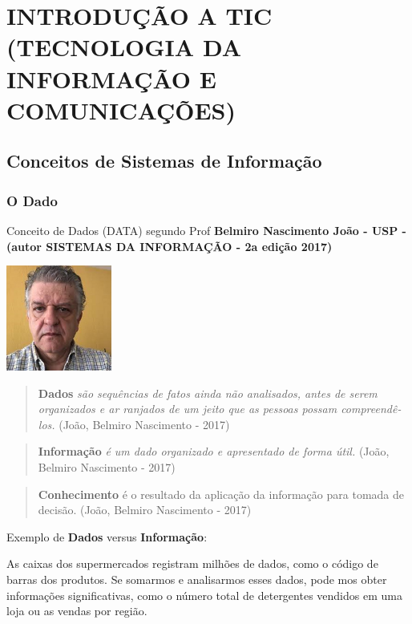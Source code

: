 \documentclass[
]{book}
\begin{document}
\chapter{INTRODUÇÃO A TIC (TECNOLOGIA DA INFORMAÇÃO E COMUNICAÇÕES)}\label{introduuxe7uxe3o-a-tic-tecnologia-da-informauxe7uxe3o-e-comunicauxe7uxf5es}

\section{Conceitos de Sistemas de Informação}\label{conceitos-de-sistemas-de-informauxe7uxe3o}

\subsection{O Dado}\label{o-dado}

Conceito de Dados (DATA) segundo Prof \textbf{Belmiro Nascimento João - USP - (autor SISTEMAS DA INFORMAÇÃO - 2a edição 2017)}

\includegraphics[width=1.36458in,height=\textheight]{images/belmiro_do_nascimento_joao-2.jpg}

\begin{quote}
\textbf{Dados} \emph{são sequências de fatos ainda não analisados, antes de serem organizados e ar­ ranjados de um jeito que as pessoas possam compreendê-los.} (João, Belmiro Nascimento - 2017)
\end{quote}

\begin{quote}
\textbf{Informação} \emph{é um dado organizado e apresentado de forma útil.} (João, Belmiro Nascimento - 2017)
\end{quote}

\begin{quote}
\textbf{Conhecimento} é o resultado da aplicação da informação para tomada de decisão. (João, Belmiro Nascimento - 2017)
\end{quote}

Exemplo de \textbf{Dados} versus \textbf{Informação}:

As caixas dos supermercados registram milhões de dados, como o código de barras dos produtos. Se somarmos e analisarmos esses dados, pode­ mos obter informações significativas, como o número total de detergentes vendidos em uma loja ou as vendas por região.
\end{document}

